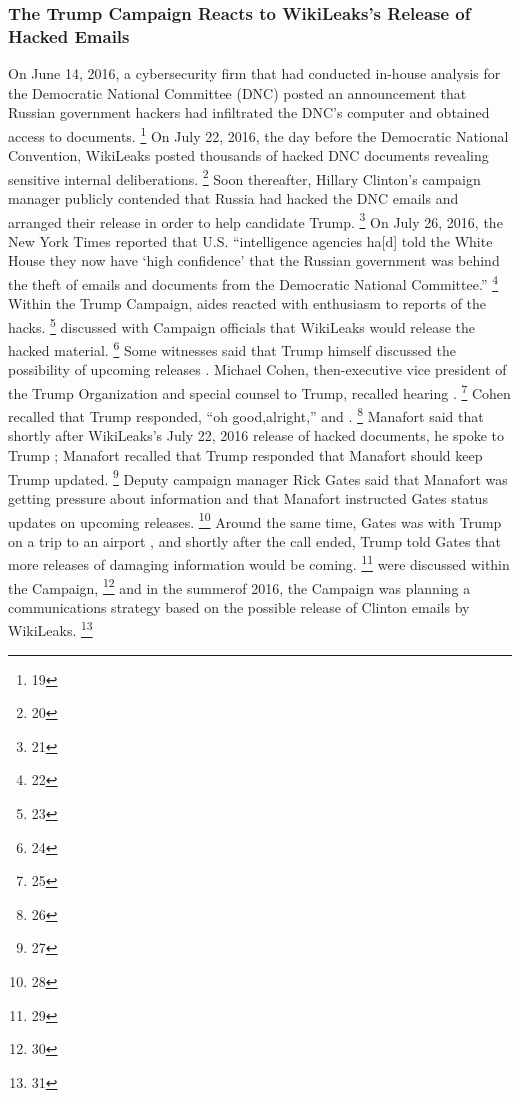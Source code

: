 \subsubsection{The Trump Campaign Reacts to WikiLeaks's Release of Hacked Emails}
On June 14, 2016, a cybersecurity firm that had conducted in-house analysis for the Democratic National Committee (DNC) posted an announcement that Russian government hackers had infiltrated the DNC's computer and obtained access to documents.%
\footnote{19}
On July 22, 2016, the day before the Democratic National Convention, WikiLeaks posted thousands of hacked DNC documents revealing sensitive internal deliberations.%
\footnote{20}
Soon thereafter, Hillary Clinton's campaign manager publicly contended that Russia had hacked the DNC emails and arranged their release in order to help candidate Trump.%
\footnote{21}
On July 26, 2016, the New York Times reported that U.S. ``intelligence agencies ha[d] told the White House they now have `high confidence' that the Russian government was behind the theft of emails and documents from the Democratic National Committee.''%
\footnote{22}
Within the Trump Campaign, aides reacted with enthusiasm to reports of the hacks.%
\footnote{23}
 discussed with Campaign officials that WikiLeaks would release the hacked material.%
\footnote{24}
Some witnesses said that Trump himself discussed the possibility of upcoming releases .
Michael Cohen, then-executive vice president of the Trump Organization and special counsel to Trump, recalled hearing .%
\footnote{25}
Cohen recalled that Trump responded, ``oh good,alright,'' and .%
\footnote{26}
Manafort said that shortly after WikiLeaks's July 22, 2016 release of hacked documents, he spoke to Trump ; Manafort recalled that Trump responded that Manafort should  keep Trump updated.%
\footnote{27}
Deputy campaign manager Rick Gates said that Manafort was getting pressure about  information and that Manafort instructed Gates  status updates on upcoming releases.%
\footnote{28}
Around the same time, Gates was with Trump on a trip to an airport , and shortly after the call ended, Trump told Gates that more releases of damaging information would be coming.%
\footnote{29}
 were discussed within the Campaign,%
\footnote{30}
and in the summerof 2016, the Campaign was planning a communications strategy based on the possible release of Clinton emails by WikiLeaks.%
\footnote{31}

